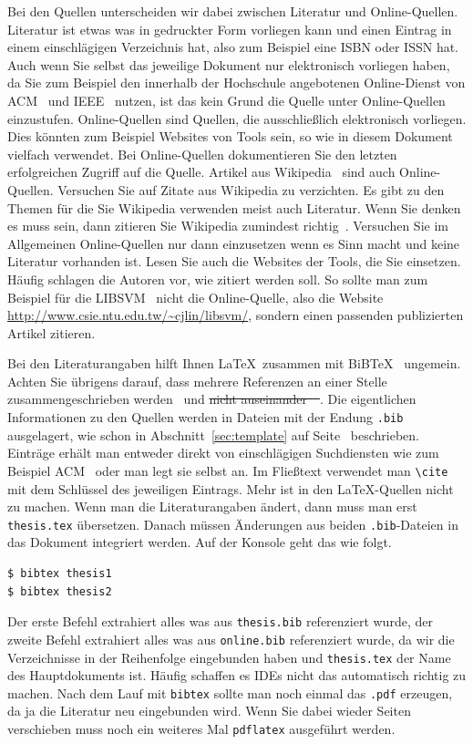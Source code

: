 \documentclass[11pt,a4paper]{report}
\begin{document}
Bei den Quellen unterscheiden wir dabei zwischen Literatur und 
Online-Quellen.
Literatur ist etwas was in gedruckter Form vorliegen kann
und einen Eintrag in einem einschlägigen Verzeichnis hat,
also zum Beispiel eine ISBN oder ISSN hat.
Auch wenn Sie selbst das jeweilige Dokument nur elektronisch 
vorliegen haben, 
da Sie zum Beispiel den innerhalb der Hochschule angebotenen
Online-Dienst von ACM~\cite{acm} und IEEE~\cite{ieee} nutzen,
ist das kein Grund die Quelle unter Online-Quellen einzustufen.
Online-Quellen sind Quellen, die ausschließlich elektronisch
vorliegen. 
Dies könnten zum Beispiel Websites von Tools sein, so wie
in diesem Dokument vielfach verwendet. 
Bei Online-Quellen dokumentieren Sie den letzten erfolgreichen
Zugriff auf die Quelle.
Artikel aus Wikipedia~\cite{wikipedia} sind auch Online-Quellen.
Versuchen Sie auf Zitate aus Wikipedia zu verzichten. 
Es gibt zu den Themen für die Sie Wikipedia verwenden meist 
auch Literatur.
Wenn Sie denken es muss sein, dann zitieren Sie Wikipedia 
zumindest richtig~\cite{wikiciting}.
Versuchen Sie im Allgemeinen Online-Quellen nur dann einzusetzen
wenn es Sinn macht und keine Literatur vorhanden ist. 
Lesen Sie auch die Websites der Tools, die Sie einsetzen. 
Häufig schlagen die Autoren vor, wie zitiert werden soll.
So sollte man zum Beispiel für die LIBSVM~\cite{libsvm}
nicht die Online-Quelle, also die Website
\url{http://www.csie.ntu.edu.tw/~cjlin/libsvm/}, 
sondern einen passenden publizierten Artikel zitieren.

Bei den Literaturangaben hilft Ihnen \LaTeX\ zusammen mit
BiBTeX~\cite{bibtexing,kopka} ungemein.
Achten Sie übrigens darauf, dass mehrere Referenzen 
an einer Stelle zusammengeschrieben werden~\cite{bibtexing,kopka}
und \st{nicht auseinander~\mbox{\cite{bibtexing}}\mbox{~\cite{kopka}}}.
Die eigentlichen Informationen zu den Quellen werden 
in Dateien mit der Endung \verb|.bib| ausgelagert,
wie schon in Abschnitt~\ref{sec:template} 
auf Seite~\pageref{page:bib} beschrieben.
Einträge erhält man entweder direkt von einschlägigen
Suchdiensten wie zum Beispiel ACM~\cite{acm} oder
man legt sie selbst an.
Im Fließtext verwendet man \verb|\cite| mit dem Schlüssel
des jeweiligen Eintrags. 
Mehr ist in den \LaTeX-Quellen nicht zu machen. 
Wenn man die Literaturangaben ändert, dann muss
man erst \verb|thesis.tex| übersetzen.
Danach müssen Änderungen aus beiden \verb|.bib|-Dateien 
in das Dokument integriert werden. 
Auf der Konsole geht das wie folgt.
\begin{verbatim}
$ bibtex thesis1
$ bibtex thesis2
\end{verbatim}
Der erste Befehl extrahiert alles was aus \verb|thesis.bib|
referenziert wurde, der zweite Befehl extrahiert alles was aus 
\verb|online.bib| referenziert wurde, 
da wir die Verzeichnisse in der Reihenfolge eingebunden haben 
und \verb|thesis.tex| der Name des Hauptdokuments ist.
Häufig schaffen es IDEs nicht das automatisch richtig zu machen. 
Nach dem Lauf mit \verb|bibtex| sollte man noch einmal 
das \verb|.pdf| erzeugen, da ja die Literatur neu eingebunden
wird. Wenn Sie dabei wieder Seiten verschieben muss noch 
ein weiteres Mal \verb|pdflatex| ausgeführt werden. 
\end{document}

